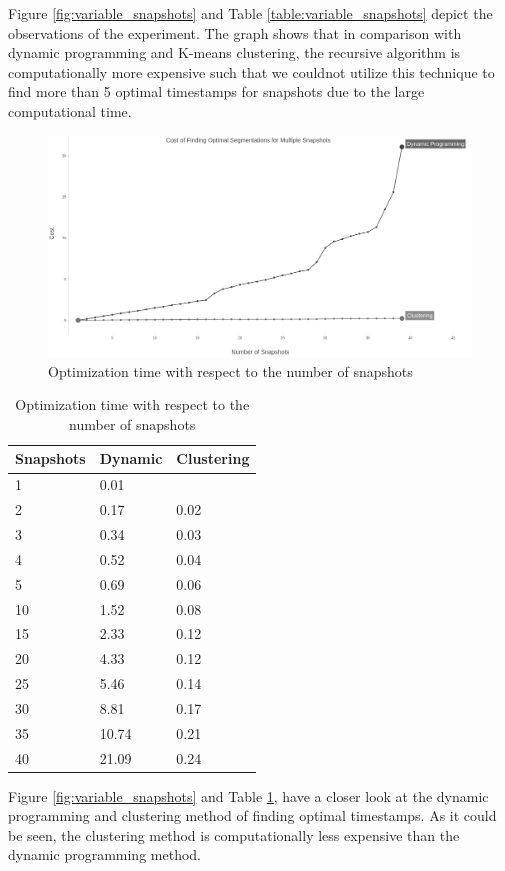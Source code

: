 			Figure \ref{fig:variable_snapshots} and Table \ref{table:variable_snapshots} depict the observations of the experiment. The graph shows that in comparison with dynamic programming and K-means clustering, the recursive algorithm is computationally more expensive such that we couldnot utilize this technique to find more than 5 optimal timestamps for snapshots due to the large computational time. 

			\begin{figure}
				\centering
				\includegraphics[width=\textwidth]{figs/multiSnapDouble.jpg}
				\caption{Optimization time with respect to the number of snapshots}
				\label{fig:variable_snapshots_2}
			\end{figure} 

			\begin{center}
			\begin{table}
				\centering
				\caption{Optimization time with respect to the number of snapshots}
				\label {table:variable_snapshots_2}
				\begin{tabular}{p{2cm}p{3cm}p{3cm}}
					\hline
					Snapshots  & Dynamic  & Clustering \\ \hline
					1 &   0.01  \\  
					2 &  0.17  & 0.02  \\
					3 &  0.34  & 0.03  \\
					4 & 0.52  & 0.04  \\
					5 &  0.69  & 0.06 \\
					10 &  1.52  & 0.08  \\
					15 & 2.33  & 0.12  \\ 
					20 & 4.33  & 0.12  \\ 
					25 & 5.46  & 0.14  \\ 
					30 & 8.81  & 0.17  \\
					35 & 10.74  & 0.21  \\
					40 & 21.09  & 0.24  \\\hline
				\end{tabular}
			\end{table}
			\end{center}
			Figure \ref{fig:variable_snapshots} and Table \ref{table:variable_snapshots_2}, have a closer look at the dynamic programming and clustering method of finding optimal timestamps. As it could be seen, the clustering method is computationally less expensive than the dynamic programming method.


